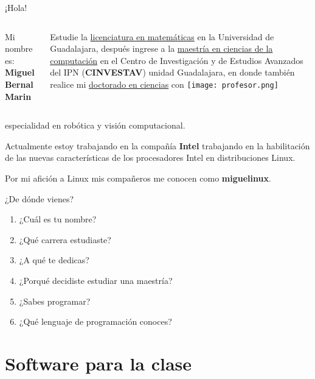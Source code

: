 \begin{frame}[c]{¡Hola!}

  \begin{columns}
      Mi nombre es: \textbf{Miguel Bernal Marin}

      \vspace{\baselineskip}
      Estudie la \underline{licenciatura en matemáticas} en la Universidad de
      Guadalajara, después ingrese a la \underline{maestría en ciencias de la
      computación} en el  Centro de Investigación y de Estudios Avanzados del
      IPN (\textbf{CINVESTAV}) unidad Guadalajara, en donde también realice
      mi \underline{doctorado en ciencias} con
      \texttt{[image: profesor.png]}
  \end{columns}

  especialidad en robótica y visión computacional.

  \vspace{\baselineskip}
  Actualmente estoy trabajando en la compañía \textbf{Intel} trabajando en la
  habilitación de las nuevas características de los procesadores Intel en
  distribuciones Linux.

  \vspace{\baselineskip}
  Por mi afición a Linux mis compañeros me conocen como \textbf{miguelinux}.

\end{frame}

\begin{frame}[c]{¿De dónde vienes?}
  \begin{enumerate}
    \item ¿Cuál es tu nombre?
    \item ¿Qué carrera estudiaste?
    \item ¿A qué te dedicas?
    \item ¿Porqué decidiste estudiar una maestría?
    \item ¿Sabes programar?
    \item ¿Qué lenguaje de programación conoces?
  \end{enumerate}
\end{frame}

\section{Software para la clase}

